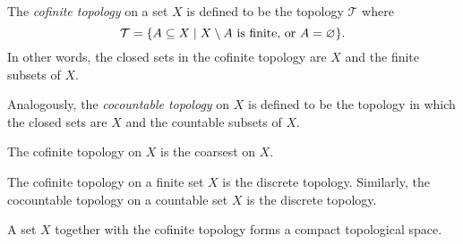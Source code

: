 \documentclass[12pt]{article}
\def\emptyset{\varnothing}
\begin{document}

The \emph{cofinite topology} on a set $X$
is defined to be the topology $\mathcal{T}$ where
\[
  \mathcal{T} = \{A \subseteq X \mid
  X \setminus A \hbox{ is finite, or } A=\emptyset\}.
\]
In other words, the closed sets in the cofinite topology are $X$ and the finite subsets of $X$.

Analogously, the \emph{cocountable topology} on $X$
is defined to be the topology
in which the closed sets are $X$ and the countable subsets of $X$.

The cofinite topology on $X$ is the coarsest  on $X$.

The cofinite topology on a finite set $X$ is the discrete topology.
Similarly, the cocountable topology on a countable set $X$ is the discrete topology.

A set $X$ together with the cofinite topology forms a compact topological space.
\end{document}
